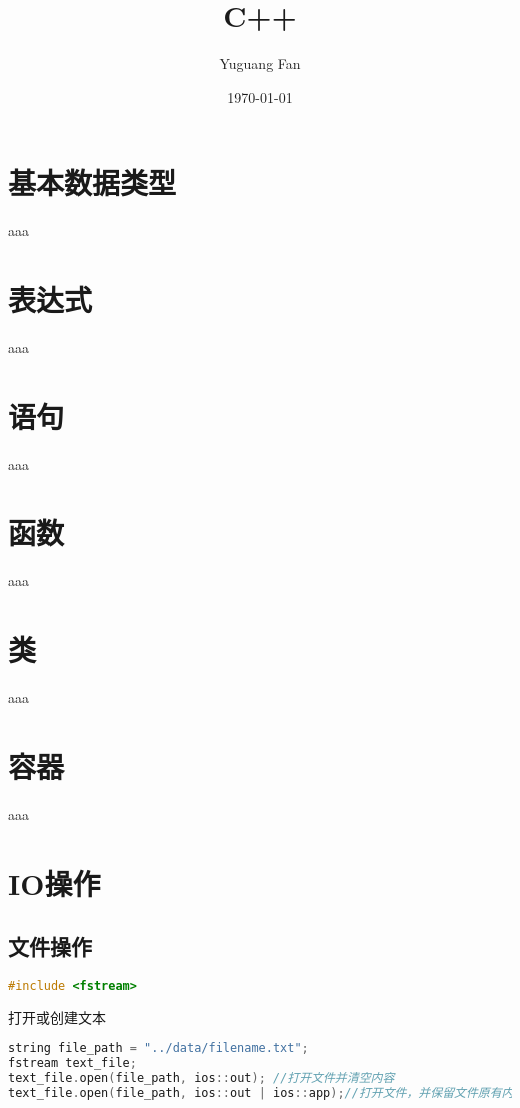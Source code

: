\documentclass[11pt,a4paper]{article}
\title{C++}
\author{Yuguang Fan}
\date{\today}
\begin{document}
\maketitle

\section{基本数据类型}

aaa

\section{表达式}

aaa

\section{语句}

aaa

\section{函数}

aaa

\section{类}

aaa

\section{容器}

aaa

\section{IO操作}

\subsection{文件操作}

\begin{lstlisting}[language={C++}]
#include <fstream>
\end{lstlisting}

打开或创建文本

\begin{lstlisting}[language={C++}]
string file_path = "../data/filename.txt";
fstream text_file;
text_file.open(file_path, ios::out); //打开文件并清空内容
text_file.open(file_path, ios::out | ios::app);//打开文件，并保留文件原有内容，定位到文件末尾
\end{lstlisting}
\end{document}
